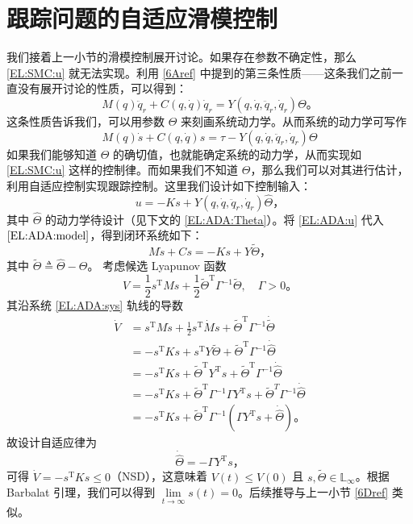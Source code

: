 \section{跟踪问题的自适应滑模控制}\label{6Eref}

我们接着上一小节的滑模控制展开讨论。如果存在参数不确定性，那么 \eqref{EL:SMC:u} 就无法实现。利用 \ref{6Aref} 中提到的第三条性质——这条我们之前一直没有展开讨论的性质，可以得到：
\[
    M (q) \ddot{q}_r + C (q, \dot{q}) \dot{q}_r = Y (q, \dot{q}, \ddot{q}_r, \dot{q}_r) \Theta \text{。}
\]
这条性质告诉我们，可以用参数 $\Theta$ 来刻画系统动力学。从而系统的动力学可写作
\begin{equation} \label{EL:ADA:model}
    M(q) \dot{s} + C(q, \dot{q}) s = \tau - Y (q, \dot{q}, \ddot{q}_r, \dot{q}_r) \Theta
\end{equation}
如果我们能够知道 $\Theta$ 的确切值，也就能确定系统的动力学，从而实现如 \eqref{EL:SMC:u} 这样的控制律。而如果我们不知道 $\Theta$，那么我们可以对其进行估计，利用自适应控制实现跟踪控制。这里我们设计如下控制输入：
\begin{equation} \label{EL:ADA:u}
    u = - K s + Y (q, \dot{q}, \ddot{q}_r, \dot{q}_r) \hat{\Theta} \text{，}
\end{equation}
其中 $\hat{\Theta}$ 的动力学待设计（见下文的 \eqref{EL:ADA:Theta}）。将 \eqref{EL:ADA:u} 代入 $\eqref{EL:ADA:model}$，得到闭环系统如下：
\begin{equation} \label{EL:ADA:sys}
    M \dot{s} + C s = - K s + Y \tilde{\Theta} \text{，}
\end{equation}
其中 $\tilde{\Theta} \triangleq \hat{\Theta} - \Theta$。
考虑候选 Lyapunov 函数
\[
    V = \frac{1}{2} s^\mathrm{T} M  s + \frac{1}{2} \tilde{\Theta}^\mathrm{T} \Gamma^{-1} \tilde{\Theta}, \quad \Gamma > 0 \text{。}
\]
其沿系统 \ref{EL:ADA:sys} 轨线的导数
\begin{align*}
    \dot{V} & = s^\mathrm{T} M \dot{s} + \frac{1}{2} s^\mathrm{T} \dot{M} s + \tilde{\Theta}^\mathrm{T} \Gamma^{-1} \dot{\tilde{\Theta}} \\
    & = - s^\mathrm{T} K  s + s^\mathrm{T} Y \tilde{\Theta} + \tilde{\Theta}^\mathrm{T} \Gamma^{- 1} \dot{\hat{\Theta}}\\
    & = - s^\mathrm{T} K  s + \tilde{\Theta}^\mathrm{T}   Y^\mathrm{T} s + \tilde{\Theta}^\mathrm{T} \Gamma^{- 1} \dot{\hat{\Theta}}\\
    & = - s^\mathrm{T} K  s + \tilde{\Theta}^\mathrm{T} \Gamma^{- 1} \Gamma  Y^\mathrm{T} s + \tilde{\Theta}^T \Gamma^{- 1} \dot{\hat{\Theta}}\\
    & = - s^\mathrm{T} K  s + \tilde{\Theta}^\mathrm{T} \Gamma^{- 1} (\Gamma  Y^\mathrm{T} s + \dot{\hat{\Theta}} ) \text{。}
\end{align*}
故设计自适应律为
\begin{equation} \label{EL:ADA:Theta}
    \dot{\hat{\Theta}} = - \Gamma Y^\mathrm{T} s \text{，}
\end{equation}
可得 $\dot{V} = - s^\mathrm{T} K s \leq 0$（NSD），这意味着 $V (t) \leq V (0)$ 且 $s, \tilde{\Theta} \in \mathbb{L}_{\infty}$。根据 Barbalat 引理，我们可以得到 $\lim\limits_{t \rightarrow \infty} s (t) = 0$。后续推导与上一小节 \ref{6Dref} 类似。

